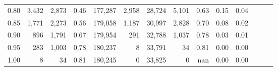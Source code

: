 \begin{tabular}{rrrrrrrrrrrrrr}
0.80 &   3,432 &  2,873 &  0.46 &  177,287 &    2,958 &  28,724 &   5,101 &  0.63 &  0.15 &      0.04 \\
0.85 &   1,771 &  2,273 &  0.56 &  179,058 &    1,187 &  30,997 &   2,828 &  0.70 &  0.08 &      0.02 \\
0.90 &     896 &  1,791 &  0.67 &  179,954 &      291 &  32,788 &   1,037 &  0.78 &  0.03 &      0.01 \\
0.95 &     283 &  1,003 &  0.78 &  180,237 &        8 &  33,791 &      34 &  0.81 &  0.00 &      0.00 \\
1.00 &       8 &     34 &  0.81 &  180,245 &        0 &  33,825 &       0 &   nan &  0.00 &      0.00 \\
\bottomrule
\end{tabular}
